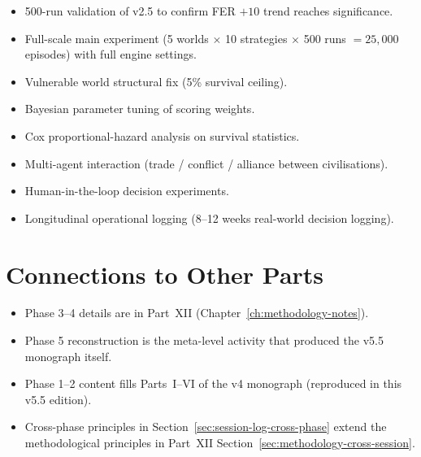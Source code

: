 \begin{itemize}
\item 500-run validation of v2.5 to confirm FER $+10$ trend reaches
significance.
\item Full-scale main experiment (5 worlds $\times$ 10 strategies
$\times$ 500 runs $= 25{,}000$ episodes) with full engine settings.
\item Vulnerable world structural fix (5\% survival ceiling).
\item Bayesian parameter tuning of scoring weights.
\item Cox proportional-hazard analysis on survival statistics.
\item Multi-agent interaction (trade / conflict / alliance between
civilisations).
\item Human-in-the-loop decision experiments.
\item Longitudinal operational logging (8--12 weeks real-world
decision logging).
\end{itemize}

\section*{Connections to Other Parts}

\begin{itemize}
\item Phase 3--4 details are in Part~XII
(Chapter~\ref{ch:methodology-notes}).
\item Phase 5 reconstruction is the meta-level activity that
produced the v5.5 monograph itself.
\item Phase 1--2 content fills Parts~I--VI of the v4 monograph
(reproduced in this v5.5 edition).
\item Cross-phase principles in
Section~\ref{sec:session-log-cross-phase} extend the methodological
principles in
Part~XII Section~\ref{sec:methodology-cross-session}.
\end{itemize}
